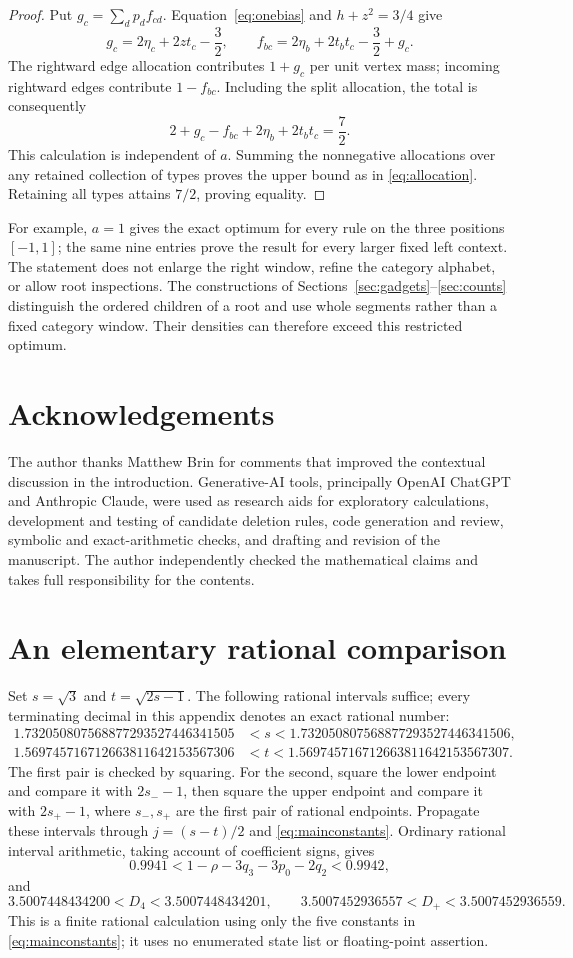 \documentclass[11pt,a4paper]{article}
\theoremstyle{definition}
\theoremstyle{remark}
\begin{document}
\begin{proof}
Put $g_c=\sum_d p_df_{cd}$. Equation~\eqref{eq:onebias} and $h+z^2=3/4$ give
\[
g_c=2\eta_c+2zt_c-\frac32,\qquad
f_{bc}=2\eta_b+2t_bt_c-\frac32+g_c.
\]
The rightward edge allocation contributes $1+g_c$ per unit vertex mass; incoming rightward edges contribute $1-f_{bc}$. Including the split allocation, the total is consequently
\[
2+g_c-f_{bc}+2\eta_b+2t_bt_c=\frac72.
\]
This calculation is independent of $a$. Summing the nonnegative allocations over any retained collection of types proves the upper bound as in \eqref{eq:allocation}. Retaining all types attains $7/2$, proving equality.
\end{proof}

For example, $a=1$ gives the exact optimum for every rule on the three positions $[-1,1]$; the same nine entries prove the result for every larger fixed left context. The statement does not enlarge the right window, refine the category alphabet, or allow root inspections. The constructions of Sections~\ref{sec:gadgets}--\ref{sec:counts} distinguish the ordered children of a root and use whole segments rather than a fixed category window. Their densities can therefore exceed this restricted optimum.

\section*{Acknowledgements}
The author thanks Matthew Brin for comments that improved the contextual discussion in the introduction. Generative-AI tools, principally OpenAI ChatGPT and Anthropic Claude, were used as research aids for exploratory calculations, development and testing of candidate deletion rules, code generation and review, symbolic and exact-arithmetic checks, and drafting and revision of the manuscript. The author independently checked the mathematical claims and takes full responsibility for the contents.

\appendix
\section{An elementary rational comparison}\label{app:comparison}
Set $s=\sqrt3$ and $t=\sqrt{2s-1}$. The following rational intervals suffice; every terminating decimal in this appendix denotes an exact rational number:
\begin{align*}
1.732050807568877293527446341505&<s<1.732050807568877293527446341506,\\
1.569745716712663811642153567306&<t<1.569745716712663811642153567307.
\end{align*}
The first pair is checked by squaring. For the second, square the lower endpoint and compare it with $2s_--1$, then square the upper endpoint and compare it with $2s_+-1$, where $s_-,s_+$ are the first pair of rational endpoints. Propagate these intervals through $j=(s-t)/2$ and \eqref{eq:mainconstants}. Ordinary rational interval arithmetic, taking account of coefficient signs, gives
\[
0.9941<1-\rho-3q_3-3p_0-2q_2<0.9942,
\]
and
\[
3.5007448434200<D_4<3.5007448434201,\qquad
3.5007452936557<D_+<3.5007452936559.
\]
This is a finite rational calculation using only the five constants in \eqref{eq:mainconstants}; it uses no enumerated state list or floating-point assertion.
\end{document}
